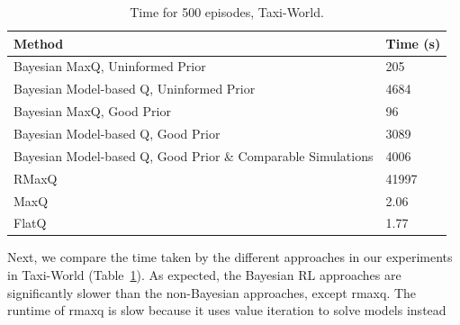 \renewcommand{\arraystretch}{1}

\begin{table}\footnotesize
\vspace{-25pt}
\caption{Time for 500 episodes, {\sf Taxi-World}.}
\label{tab:time}
\begin{tabular}{|p{140pt}|p{30pt}|}
\hline

Method & Time (s)\\ \hline

Bayesian MaxQ, Uninformed Prior &205\\ 

Bayesian Model-based Q, Uninformed Prior &4684\\ 

Bayesian MaxQ, Good Prior &96\\ 

Bayesian Model-based Q, Good Prior &3089\\ 

Bayesian Model-based Q, Good Prior \& Comparable Simulations
&4006 \\ 
RMaxQ &41997 \\
MaxQ &2.06 \\
FlatQ &1.77 \\
\hline
\end{tabular}
\vspace{-10pt}
\end{table}
Next, we compare the time taken by the different approaches in our
experiments in {\sf Taxi-World} (Table~\ref{tab:time}). As expected,
the Bayesian RL approaches are significantly slower than the
non-Bayesian approaches, except {\sc rmaxq}. The runtime of {\sc
rmaxq} is slow because it uses value iteration to solve models instead

